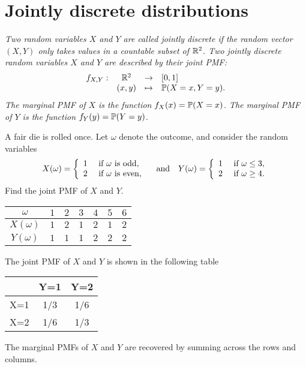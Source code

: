 
\section{Jointly discrete distributions}
\begin{definition}
\ben
\it Two random variables $X$ and $Y$ are called \emph{jointly discrete} if the random vector $(X,Y)$ only takes values in a countable subset of $\mathbb{R}^2$. 
\it Two jointly discrete random variables $X$ and $Y$ are described by their \emph{joint PMF}: 
\[
\begin{array}{cccl}
f_{X,Y}:		& \mathbb{R}^2	& \to		& [0,1] \\
			& (x,y)	& \mapsto	& \mathbb{P}(X=x,Y=y).
\end{array}
\]
\it The \emph{marginal PMF of $X$} is the function $f_X(x)=\mathbb{P}(X=x)$.
\it The \emph{marginal PMF of $Y$} is the function $f_Y(y)=\mathbb{P}(Y=y)$.
\een
\end{definition}

\begin{example}\label{ex:joint:dice}
A fair die is rolled once. Let $\omega$ denote the outcome, and consider the random variables
\[
X(\omega) = \left\{\begin{array}{cl}
	1 & \text{ if $\omega$ is odd}, \\
	2 & \text{ if $\omega$ is even},
\end{array}\right. 
\text{\quad and\quad}
Y(\omega) = \left\{\begin{array}{cl}
	1 & \text{ if $\omega\leq 3$}, \\
	2 & \text{ if $\omega\geq 4$}.
\end{array}\right.
\]
Find the joint PMF of $X$ and $Y$.
\end{example}

\begin{solution}
\begin{center}
\begin{tabular}{c|cccccc}
$\omega$ 	& $1$ & $2$ & $3$ & $4$ & $5$ & $6$ \\ \hline
$X(\omega)$ 	& $1$ & $2$ & $1$ & $2$ & $1$ & $2$ \\
$Y(\omega)$ 	& $1$ & $1$ & $1$ & $2$ & $2$ & $2$
\end{tabular}
\end{center}

The joint PMF of $X$ and $Y$ is shown in the following table
\begin{center}
\begin{tabular}{c|cc}
		& Y=1 	& Y=2	\\ \hline
X=1		& 1/3	& 1/6	\\ 
X=2		& 1/6 	& 1/3	
\end{tabular}
\end{center}
The marginal PMFs of $X$ and $Y$ are recovered by summing across the rows and columns.
\end{solution}



